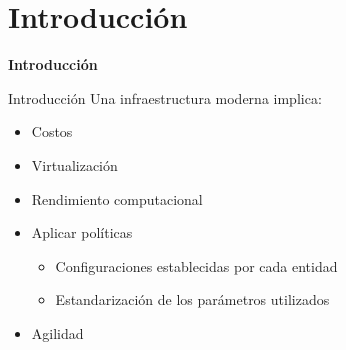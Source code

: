 \section{Introducción}

\begin{frame}
    \Huge
    \centering
    \textbf{Introducción}

\end{frame}


\begin{frame}{Introducción}
    \vspace{0cm}
    Una infraestructura moderna implica:
    \begin{itemize}
        \item Costos
        \item Virtualización
        \item Rendimiento computacional
        \item Aplicar políticas
                \begin{itemize}
                    \item Configuraciones establecidas por cada entidad
                    \item Estandarización de los parámetros utilizados
        \end{itemize}
        \item Agilidad
    \end{itemize}
\end{frame}

